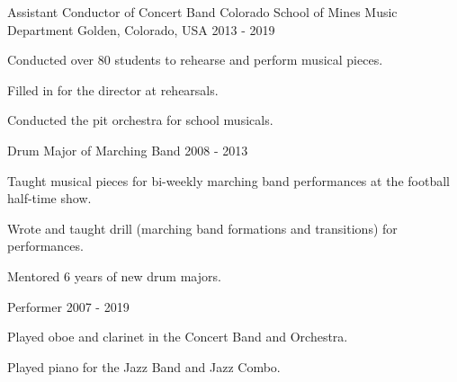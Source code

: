 

\begin{cventries}

  \cventry
    {Assistant Conductor of Concert Band} %
    {Colorado School of Mines Music Department} %
    {Golden, Colorado, USA} %
    {2013 - 2019} %
    {
      \begin{cvitems} %
        \item {Conducted over 80 students to rehearse and perform musical pieces.}
        \item {Filled in for the director at rehearsals.}
        \item {Conducted the pit orchestra for school musicals.}
      \end{cvitems}
    }

  \cventry
    {Drum Major of Marching Band} %
    {} %
    {} %
    {2008 - 2013} %
    {
      \begin{cvitems} %
        \item {Taught musical pieces for bi-weekly marching band performances at the football half-time show.}
        \item {Wrote and taught drill (marching band formations and transitions) for performances.}
        \item {Mentored 6 years of new drum majors.}
      \end{cvitems}
    }

      \cventry
    {Performer} %
    {} %
    {} %
    {2007 - 2019} %
    {
      \begin{cvitems} %
        \item {Played oboe and clarinet in the Concert Band and Orchestra.}
        \item {Played piano for the Jazz Band and Jazz Combo.}
      \end{cvitems}
    }


\end{cventries}
